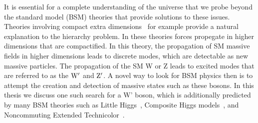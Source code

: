 It is essential for a complete understanding of the universe that we probe beyond the standard model (BSM) theories that provide solutions to these issues.  
Theories involving compact extra dimensions~\cite{PhysRevD.64.035002} for example provide a natural explanation to the hierarchy problem.  
In these theories forces propegate in higher dimensions that are compactified.   
In this theory, the propagation of SM massive fields in higher dimensions leads to discrete modes, which are detectable as new massive particles.  
The propagation of the SM W or Z leads to excited modes that are referred to as the $\mathrm{W}^{\prime}$ and $\mathrm{Z}^{\prime}$.
A novel way to look for BSM physics then is to attempt the creation and detection of massive states such as these bosons. 
In this thesis we discuss one such search for a W' boson, which is additionally predicted by many BSM theories such as Little Higgs~\cite{doi:10.1146/annurev.nucl.55.090704.151502}, 
Composite Higgs models~\cite{Vecchi:2013bja}, and Noncommuting Extended Technicolor~\cite{Chivukula:1995gu}.  



